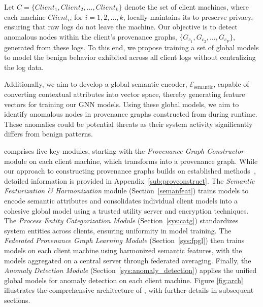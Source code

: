 

Let \( C = \{Client_1, Client_2, \ldots, Client_k\} \) denote the set of client machines, where each machine \( Client_i \), for \( i = 1, 2, \ldots, k \), locally maintains its \logs to preserve privacy, ensuring that raw logs do not leave the machine. Our objective is to detect anomalous nodes within the client's provenance graphs, \( \{G_{c_1}, G_{c_2}, \ldots, G_{c_P}\} \), generated from these logs. To this end, we propose training a set of global \gnnshort models to model the benign behavior exhibited across all client logs without centralizing the log data.

Additionally, we aim to develop a global semantic encoder, \( \mathcal{E}_{\text{semantic}} \), capable of converting contextual attributes into vector space, thereby generating feature vectors for training our GNN models. Using these global \gnnshort models, we aim to identify anomalous nodes in provenance graphs constructed from \logs during runtime. These anomalies could be potential threats as their system activity significantly differs from benign patterns.

\Sys comprises five key modules, starting with the \textit{Provenance Graph Constructor} module on each client machine, which transforms \logs into a provenance graph. While our approach to constructing provenance graphs builds on established methods~\cite{inam2023sok,nodoze2019,mpi+ma,loggc,lpm2015,hossain2017sleuth}, detailed information is provided in Appendix~\ref{sub:provconstruct}. The \textit{Semantic Featurization \& Harmonization} module (Section~\ref{semanfeat}) trains \wordvec models to encode semantic attributes and consolidates individual client models into a cohesive global model using a trusted utility server and encryption techniques. The \textit{Process Entity Categorization Module} (Section~\ref{sys:catg}) standardizes system entities across clients, ensuring uniformity in \gnnshort model training. The \textit{Federated Provenance Graph Learning Module} (Section~\ref{sys:fpgl}) then trains \gnnshort models on each client machine using harmonized semantic features, with the models aggregated on a central server through federated averaging. Finally, the \textit{Anomaly Detection Module} (Section~\ref{sys:anomaly_detection}) applies the unified global models for anomaly detection on each client machine. Figure \ref{fig:arch} illustrates the comprehensive architecture of \Sys, with further details in subsequent sections.


